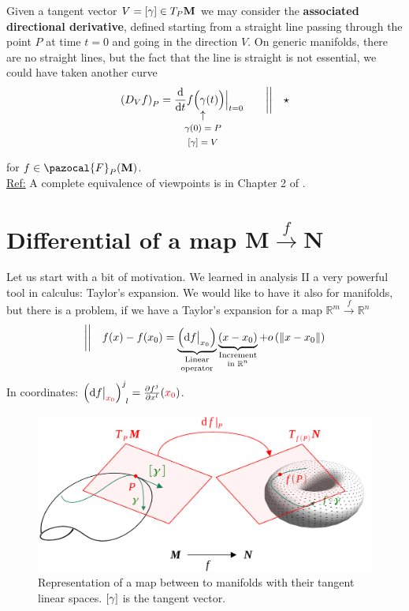 \documentclass[../main.tex]{subfiles}
\begin{document}
Given a tangent vector $V=\qty[\gamma]\in T_P\mathbf{M}$ we may consider the \textbf{associated directional derivative}, defined starting from a straight line passing through the point $P$ at time $t=0$ and going in the direction $V$. On generic manifolds, there are no straight lines, but the fact that the line is straight is not essential, we could have taken another curve
\[
\left(D_V f\right)_P=\frac{\textrm{d}}{\textrm{d}t}f\Big(\underset{\mathclap{\tikz \node {$\uparrow$} node [below=1ex] {\footnotesize $\gamma(0)=P$} node [below=4ex] {\footnotesize $\qty[\gamma]=V$} ;}}{\gamma}(t)\Big)\Big|_{t=0} \qquad \bigg|\bigg|\quad \star
\]
for $f\in\pazocal{F}_P(\mathbf{M})$.\\
\underline{Ref:} A complete equivalence of viewpoints is in Chapter 2 of .
\section[Differential of a map]{Differential of a map $\mathbf{M}\xrightarrow{f}\mathbf{N}$}
Let us start with a bit of motivation. We learned in analysis II a very powerful tool in calculus: Taylor's expansion. We would like to have it also for manifolds, but there is a problem, if we have a Taylor's expansion for a map $\mathbb{R}^m\xrightarrow{f}\mathbb{R}^n$
\[
\bigg|\bigg|\quad f(x)-f(x_0)=\underbrace{\left(\textrm{d}f\big|_{x_0}\right)}_{\mathclap{\text{\parbox{4 cm}{\centering Linear \\[-4pt]  operator}}}}\underbrace{\left(x-x_0\right)}_{\mathclap{\text{\parbox{4 cm}{\centering Increment \\[-4pt] in $\mathbb{R}^n$}}}}+o \left(\norm{x-x_0}\right)
\]
In coordinates: \(\left(\textrm{d}f\big|_{\color{red}x_0}\right)^j_{\ l}=\frac{\partial f^j}{\partial x^l}({\color{red} x_0})\).
\begin{figure}[H]
	\includegraphics{images/differential_of_a_map.pdf}
	\caption[Differential of a map]{Representation of a map between to manifolds with their tangent linear spaces. $\qty[\gamma]$ is the tangent vector.}
\end{figure}
\end{document}
